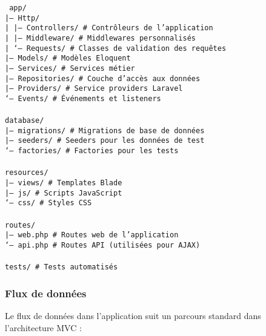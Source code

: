 \begin{tcolorbox}[colback=black!5!white, colframe=black!75!white, title=Structure du projet OptiHR, fonttitle=\bfseries]
\texttt{
app/ \\
|-- Http/ \\
|   |-- Controllers/  \quad \# Contrôleurs de l'application \\
|   |-- Middleware/   \quad \# Middlewares personnalisés \\
|   `-- Requests/     \quad \# Classes de validation des requêtes \\
|-- Models/           \quad \# Modèles Eloquent \\
|-- Services/         \quad \# Services métier \\
|-- Repositories/     \quad \# Couche d'accès aux données \\
|-- Providers/        \quad \# Service providers Laravel \\
`-- Events/           \quad \# Événements et listeners \\
\\
database/ \\
|-- migrations/       \quad \# Migrations de base de données \\
|-- seeders/          \quad \# Seeders pour les données de test \\
`-- factories/        \quad \# Factories pour les tests \\
\\
resources/ \\
|-- views/            \quad \# Templates Blade \\
|-- js/               \quad \# Scripts JavaScript \\
`-- css/              \quad \# Styles CSS \\
\\
routes/ \\
|-- web.php           \quad \# Routes web de l'application \\
`-- api.php           \quad \# Routes API (utilisées pour AJAX) \\
\\
tests/                \quad \# Tests automatisés \\
}
\end{tcolorbox}

\subsubsection{Flux de données}
Le flux de données dans l'application suit un parcours standard dans l'architecture MVC :

